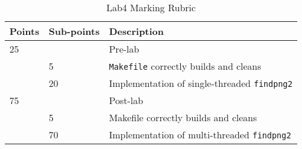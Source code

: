 \begin{table}[ht]
\begin{center}
\begin{tabular}{|p{2cm}|p{2cm}|p{9cm}|}
\hline
Points & Sub-points &Description  \\ \hline
25     &    & Pre-lab      \\ \hline
       & 5  & \verb+Makefile+ correctly builds and cleans \\ \hline
       & 20 & Implementation of single-threaded \verb+findpng2+ \\ \hline
75     &       & Post-lab \\ \hline
       & 5     & Makefile correctly builds and cleans \\ \hline
       & 70    & Implementation of multi-threaded \verb+findpng2+ \\ \hline
\end{tabular}
\caption{Lab4 Marking Rubric}
\label{tb_lab4_rubric}
\end{center}
\end{table}

